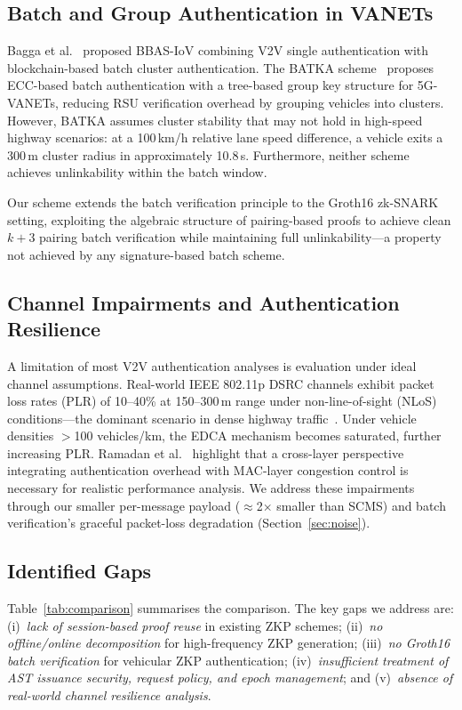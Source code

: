 \subsection{Batch and Group Authentication in VANETs}

Bagga et al.~\cite{bagga2020bbas} proposed BBAS-IoV combining V2V single
authentication with blockchain-based batch cluster authentication. The BATKA
scheme~\cite{batka2025} proposes ECC-based batch authentication with a tree-based
group key structure for 5G-VANETs, reducing RSU verification overhead by grouping
vehicles into clusters. However, BATKA assumes cluster stability that may not hold
in high-speed highway scenarios: at a 100\,km/h relative lane speed difference, a
vehicle exits a 300\,m cluster radius in approximately 10.8\,s. Furthermore,
neither scheme achieves unlinkability within the batch window.

Our scheme extends the batch verification principle to the Groth16 zk-SNARK setting,
exploiting the algebraic structure of pairing-based proofs to achieve clean $k+3$
pairing batch verification while maintaining full unlinkability---a property not
achieved by any signature-based batch scheme.

\subsection{Channel Impairments and Authentication Resilience}

A limitation of most V2V authentication analyses is evaluation under ideal channel
assumptions. Real-world IEEE 802.11p DSRC channels exhibit packet loss rates (PLR)
of 10--40\% at 150--300\,m range under non-line-of-sight (NLoS) conditions---the
dominant scenario in dense highway traffic~\cite{ramadan2025}. Under vehicle
densities $>$100 vehicles/km, the EDCA mechanism becomes saturated, further
increasing PLR. Ramadan et al.~\cite{ramadan2025} highlight that a cross-layer
perspective integrating authentication overhead with MAC-layer congestion control
is necessary for realistic performance analysis. We address these impairments
through our smaller per-message payload ($\approx$2$\times$ smaller than SCMS)
and batch verification's graceful packet-loss degradation (Section~\ref{sec:noise}).

\subsection{Identified Gaps}

Table~\ref{tab:comparison} summarises the comparison. The key gaps we address are:
(i)~\emph{lack of session-based proof reuse} in existing ZKP schemes;
(ii)~\emph{no offline/online decomposition} for high-frequency ZKP generation;
(iii)~\emph{no Groth16 batch verification} for vehicular ZKP authentication;
(iv)~\emph{insufficient treatment of AST issuance security, request policy, and
epoch management}; and (v)~\emph{absence of real-world channel resilience analysis}.

